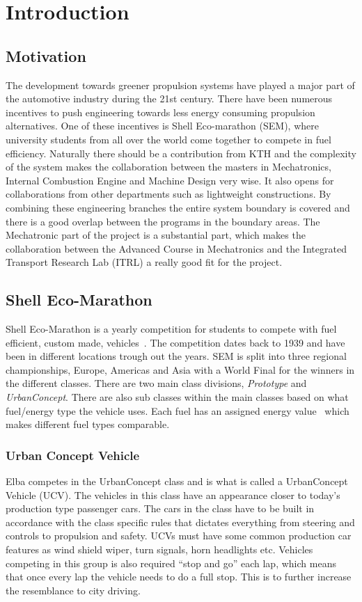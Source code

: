 \chapter{Introduction}
\section{Motivation}
The development towards greener propulsion systems have played a major part of
the automotive industry during the 21st century. There have been numerous
incentives to push engineering towards less energy consuming propulsion
alternatives. One of these incentives is Shell Eco-marathon (SEM), where
university students from all over the world come together to compete in fuel
efficiency. Naturally there should be a contribution from KTH and the complexity
of the system makes the collaboration between the masters in Mechatronics,
Internal Combustion Engine and Machine Design very wise. It also opens for collaborations from other departments such as lightweight constructions. By combining these
engineering branches the entire system boundary is covered and there is a good
overlap between the programs in the boundary areas. The Mechatronic part of the
project is a substantial part, which makes the collaboration between the
Advanced Course in Mechatronics and the Integrated Transport Research Lab (ITRL)
a really good fit for the project.

\section{Shell Eco-Marathon}
Shell Eco-Marathon is a yearly competition for students to compete with fuel
efficient, custom made, vehicles~\cite{SEM_web}. The competition dates back to
1939 and have been in different locations trough out the years. SEM is split
into three regional championships, Europe, Americas and Asia with a World Final
for the winners in the different classes. There are two main class divisions,
\textit{Prototype} and \textit{UrbanConcept}. There are also sub classes within
the main classes based on what fuel/energy type the vehicle uses. Each fuel has
an assigned energy value~\cite{semrules16c1} which makes different fuel types
comparable.

\subsection{Urban Concept Vehicle}\label{UCV}
Elba competes in the UrbanConcept class and is what is called a UrbanConcept
Vehicle (UCV). The vehicles in this class have an appearance closer to today's
production type passenger cars. The cars in the class have to be built in
accordance with the class specific rules that dictates everything from steering
and controls to propulsion and safety. UCVs must have some common production
car features as wind shield wiper, turn signals, horn headlights etc. Vehicles
competing in this group is also required ``stop and go'' each lap, which means
that once every lap the vehicle needs to do a full stop. This is to further
increase the resemblance to city driving.

